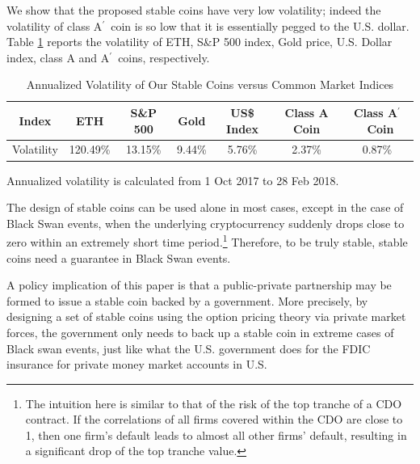 \documentclass[draft, noinfoline]{ectaart}
\numberwithin{equation}{section}
\theoremstyle{plain}
\newcommand{\Ap}{A\ensuremath{^\prime}~}
\begin{document}
We show that the proposed stable coins have very low volatility; indeed the volatility of class \Ap coin is so low that it is essentially pegged to the U.S. dollar.
Table \ref{tbl:volcomp} reports the volatility of ETH, S\&P 500 index, Gold price, U.S. Dollar index, class A and \Ap coins, respectively.

\begin{table}[!htb]
	\footnotesize
	\centering
	\caption{Annualized Volatility of Our Stable Coins versus Common Market Indices}\label{tbl:volcomp}
	\begin{tabular}{@{}c c c c c c c}
	\toprule
	Index & ETH & S\&P 500 & Gold &  US\$ Index & Class A Coin & Class \Ap Coin \\\midrule
	Volatility & 120.49\% & 13.15\% & 9.44\%  & 5.76\% & 2.37\% & 0.87\%\\
	\bottomrule
	\end{tabular}
	\vspace{0.5em}
	\par\flushleft\footnotesize Annualized volatility is calculated from 1 Oct 2017 to 28 Feb 2018.
\end{table}


The design of stable coins can be used alone in most cases, except in the case of Black Swan events, when the underlying cryptocurrency suddenly drops close to zero within an extremely short time period.\footnote{The intuition here is similar to that of the risk of the top tranche of a CDO contract. If the correlations of all firms covered within the CDO are close to 1, then one firm's default leads to almost all other firms' default, resulting in a significant drop of the top tranche value.} Therefore, to be truly stable, stable coins need a guarantee in Black Swan events.




A policy implication of this paper is that a public-private partnership may be formed to issue a stable coin backed by a government. More precisely, by designing a set of stable coins using the option pricing theory via private market forces, the government only needs to back up a stable coin in extreme cases of Black swan events, just like what the U.S. government does for the FDIC insurance for private money market accounts in U.S.


\end{document}
